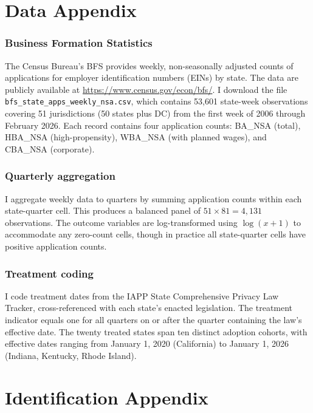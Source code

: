 \documentclass[12pt]{article}
\begin{document}
\label{apep_main_text_end}
\newpage


\newpage
\appendix

\section{Data Appendix}

\subsubsection*{Business Formation Statistics} The Census Bureau's BFS provides weekly, non-seasonally adjusted counts of applications for employer identification numbers (EINs) by state. The data are publicly available at \url{https://www.census.gov/econ/bfs/}. I download the file \texttt{bfs\_state\_apps\_weekly\_nsa.csv}, which contains 53,601 state-week observations covering 51 jurisdictions (50 states plus DC) from the first week of 2006 through February 2026. Each record contains four application counts: BA\_NSA (total), HBA\_NSA (high-propensity), WBA\_NSA (with planned wages), and CBA\_NSA (corporate).

\subsubsection*{Quarterly aggregation} I aggregate weekly data to quarters by summing application counts within each state-quarter cell. This produces a balanced panel of $51 \times 81 = 4{,}131$ observations. The outcome variables are log-transformed using $\log(x + 1)$ to accommodate any zero-count cells, though in practice all state-quarter cells have positive application counts.

\subsubsection*{Treatment coding} I code treatment dates from the IAPP State Comprehensive Privacy Law Tracker, cross-referenced with each state's enacted legislation. The treatment indicator equals one for all quarters on or after the quarter containing the law's effective date. The twenty treated states span ten distinct adoption cohorts, with effective dates ranging from January 1, 2020 (California) to January 1, 2026 (Indiana, Kentucky, Rhode Island).

\section{Identification Appendix}
\end{document}
